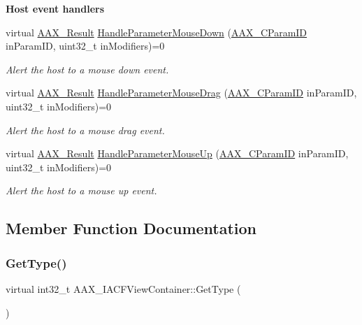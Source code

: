 \begin{Indent}\textbf{ Host event handlers}\par
\begin{DoxyCompactItemize}
\item 
virtual \mbox{\hyperlink{a00392_a4d8f69a697df7f70c3a8e9b8ee130d2f}{A\+A\+X\+\_\+\+Result}} \mbox{\hyperlink{a01765_aef633dc27ae6b8691d2add3c12158de0}{Handle\+Parameter\+Mouse\+Down}} (\mbox{\hyperlink{a00392_a1440c756fe5cb158b78193b2fc1780d1}{A\+A\+X\+\_\+\+C\+Param\+ID}} in\+Param\+ID, uint32\+\_\+t in\+Modifiers)=0
\begin{DoxyCompactList}\small\item\em Alert the host to a mouse down event. \end{DoxyCompactList}\item 
virtual \mbox{\hyperlink{a00392_a4d8f69a697df7f70c3a8e9b8ee130d2f}{A\+A\+X\+\_\+\+Result}} \mbox{\hyperlink{a01765_a83b6de012903c422d660f760416e1e26}{Handle\+Parameter\+Mouse\+Drag}} (\mbox{\hyperlink{a00392_a1440c756fe5cb158b78193b2fc1780d1}{A\+A\+X\+\_\+\+C\+Param\+ID}} in\+Param\+ID, uint32\+\_\+t in\+Modifiers)=0
\begin{DoxyCompactList}\small\item\em Alert the host to a mouse drag event. \end{DoxyCompactList}\item 
virtual \mbox{\hyperlink{a00392_a4d8f69a697df7f70c3a8e9b8ee130d2f}{A\+A\+X\+\_\+\+Result}} \mbox{\hyperlink{a01765_ac54c6aaa28ccfaf09ec99ec707e0a8ac}{Handle\+Parameter\+Mouse\+Up}} (\mbox{\hyperlink{a00392_a1440c756fe5cb158b78193b2fc1780d1}{A\+A\+X\+\_\+\+C\+Param\+ID}} in\+Param\+ID, uint32\+\_\+t in\+Modifiers)=0
\begin{DoxyCompactList}\small\item\em Alert the host to a mouse up event. \end{DoxyCompactList}\end{DoxyCompactItemize}
\end{Indent}


\subsection{Member Function Documentation}
\mbox{\label{a01765_ac3741d648a766bab6ab292214db42f76}} 
\subsubsection{\texorpdfstring{GetType()}{GetType()}}
{\footnotesize\ttfamily virtual int32\+\_\+t A\+A\+X\+\_\+\+I\+A\+C\+F\+View\+Container\+::\+Get\+Type (\begin{DoxyParamCaption}{ }\end{DoxyParamCaption})\hspace{0.3cm}{\ttfamily [pure virtual]}}



